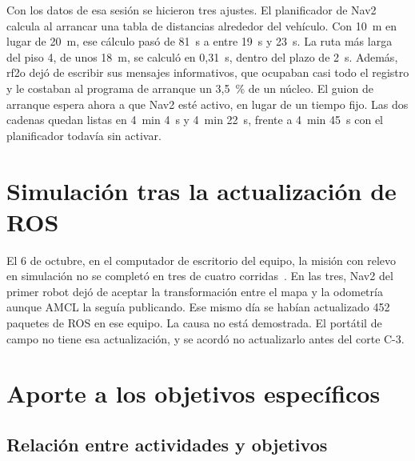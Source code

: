 \documentclass[12pt,letterpaper]{article}
\begin{document}
Con los datos de esa sesión se hicieron tres ajustes. El planificador de Nav2 calcula al arrancar una tabla de distancias alrededor del vehículo. Con 10~m en lugar de 20~m, ese cálculo pasó de 81~s a entre 19~s y 23~s. La ruta más larga del piso 4, de unos 18~m, se calculó en 0,31~s, dentro del plazo de 2~s. Además, rf2o dejó de escribir sus mensajes informativos, que ocupaban casi todo el registro y le costaban al programa de arranque un 3,5~\% de un núcleo. El guion de arranque espera ahora a que Nav2 esté activo, en lugar de un tiempo fijo. Las dos cadenas quedan listas en 4~min 4~s y 4~min 22~s, frente a 4~min 45~s con el planificador todavía sin activar.

\section{Simulación tras la actualización de ROS}

El 6 de octubre, en el computador de escritorio del equipo, la misión con relevo en simulación no se completó en tres de cuatro corridas~\cite{simulacion}. En las tres, Nav2 del primer robot dejó de aceptar la transformación entre el mapa y la odometría aunque AMCL la seguía publicando. Ese mismo día se habían actualizado 452 paquetes de ROS en ese equipo. La causa no está demostrada. El portátil de campo no tiene esa actualización, y se acordó no actualizarlo antes del corte C-3.

\section{Aporte a los objetivos específicos}
\label{sec:aporte}

\subsection{Relación entre actividades y objetivos}
\end{document}
